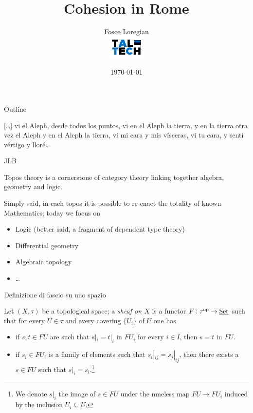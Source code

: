 \documentclass[presentation]{beamer}
\author{Fosco Loregian \\[3pt] \includegraphics[scale=1.5]{logo.pdf}}
\date{\today}
\title{Cohesion in Rome}
\begin{document}
\maketitle
\begin{frame}{Outline}
	\linespread{.66}
	\epigraph{
    \tiny [\dots\unkern] vi el Aleph, desde todos los puntos, vi en el Aleph la tierra, y en la tierra otra vez el Aleph y en el Aleph la tierra, vi mi cara y mis vísceras, vi tu cara, y sentí vértigo y lloré\dots%
    }{JLB}
	\linespread{1}
	Topos theory is a cornerstone of category theory linking together algebra, geometry and logic.

	Simply said, in each topos it is possible to re-enact the totality of known Mathematics; today we focus on
	\begin{itemize}
		\item<+-> Logic (better said, a fragment of \alert{dependent type theory})
		\item<+-> Differential geometry
		\item<+-> Algebraic topology
		\item<+-> \dots
	\end{itemize}
\end{frame}
\begin{frame}[label={sec:orgd0201f8}]{Definizione di fascio su uno spazio}
	\begin{block}{}
		Let $(X,\tau)$ be a topological space; a \emph{sheaf on $X$} is a functor $F : \tau^{\text{op}}\to \underline{\text{Set}}$ such that for every $U\in\tau$ and every covering $\{U_i\}$ of $U$ one has
		\begin{itemize}
			\item<+-> if $s, t\in FU$ are such that $s|_i = t|_i$ in $FU_i$ for every $i\in I$, then $s=t$ in $FU$.
			\item<+-> if $s_i\in FU_i$ is a family of elements such that $s_i|_{ij} = s_j|_{ij}$, then there exists a $s\in FU$ such that $s|_i = s_i$.\footnote{We denote $s|_i$ the image of $s\in FU$ under the nmeless map $FU\to FU_i$ induced by the inclusion $U_i\subseteq U$.}
		\end{itemize}
	\end{block}
\end{frame}
\end{document}
